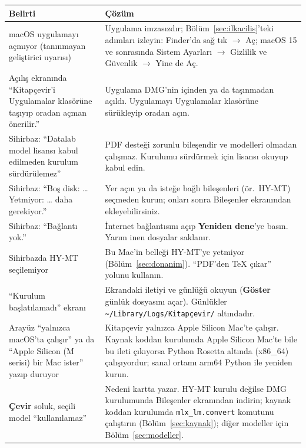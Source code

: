 \documentclass[11pt,a4paper]{article}
\newcommand{\dugme}[1]{\textsf{\bfseries #1}}
\newcommand{\dosya}[1]{\texttt{#1}}
\newcommand{\ok}{\(\rightarrow\)}
\begin{document}
\renewcommand{\arraystretch}{1.35}
\setlength{\LTleft}{0pt}
\setlength{\LTright}{\fill}
\begin{longtable}{@{}L{5.7cm}L{9.7cm}@{}}
\toprule
\textbf{Belirti} & \textbf{Çözüm} \\
\midrule
\endhead
macOS uygulamayı açmıyor (tanınmayan geliştirici uyarısı) & Uygulama
imzasızdır; Bölüm~\ref{sec:ilkacilis}'teki adımları izleyin: Finder'da sağ tık
\ok{} Aç; macOS 15 ve sonrasında Sistem Ayarları \ok{} Gizlilik ve Güvenlik
\ok{} Yine de Aç. \\
Açılış ekranında ``Kitapçevir'i Uygulamalar klasörüne taşıyıp oradan açman
önerilir.'' & Uygulama DMG'nin içinden ya da taşınmadan açıldı. Uygulamayı
Uygulamalar klasörüne sürükleyip oradan açın. \\
Sihirbaz: ``Datalab model lisansı kabul edilmeden kurulum sürdürülemez'' &
PDF desteği zorunlu bileşendir ve modelleri olmadan çalışmaz. Kurulumu
sürdürmek için lisansı okuyup kabul edin. \\
Sihirbaz: ``Boş disk: \ldots{} Yetmiyor: \ldots{} daha gerekiyor.'' & Yer
açın ya da isteğe bağlı bileşenleri (ör.\ HY-MT) seçmeden kurun; onları sonra
Bileşenler ekranından ekleyebilirsiniz. \\
Sihirbaz: ``Bağlantı yok.'' & İnternet bağlantısını açıp \dugme{Yeniden
dene}'ye basın. Yarım inen dosyalar saklanır. \\
Sihirbazda HY-MT seçilemiyor & Bu Mac'in belleği HY-MT'ye yetmiyor
(Bölüm~\ref{sec:donanim}). ``PDF'den TeX çıkar'' yolunu kullanın. \\
``Kurulum başlatılamadı'' ekranı & Ekrandaki iletiyi ve günlüğü okuyun
(\dugme{Göster} günlük dosyasını açar). Günlükler
\dosya{\textasciitilde/Library/\allowbreak Logs/\allowbreak Kitapçevir/}
altındadır. \\
Arayüz ``yalnızca macOS'ta çalışır'' ya da ``Apple Silicon (M serisi) bir
Mac ister'' yazıp duruyor & Kitapçevir yalnızca Apple Silicon Mac'te çalışır.
Kaynak koddan kurulumda Apple Silicon Mac'te bile bu ileti çıkıyorsa Python
Rosetta altında (x86\_64) çalışıyordur; sanal ortamı arm64 Python ile yeniden
kurun. \\
\dugme{Çevir} soluk, seçili model ``kullanılamaz'' & Nedeni kartta yazar.
HY-MT kurulu değilse DMG kurulumunda Bileşenler ekranından indirin; kaynak
koddan kurulumda \dosya{mlx\_lm.convert} komutunu çalıştırın
(Bölüm~\ref{sec:kaynak}); diğer modeller için Bölüm~\ref{sec:modeller}. \\

\end{longtable}
\end{document}
